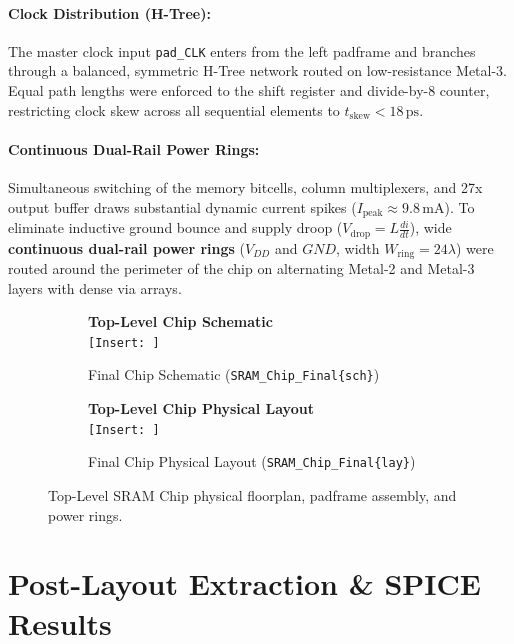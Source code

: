 \documentclass[10pt,a4paper,titlepage]{article}
\newcommand{\imageplaceholder}[3][3.4cm]{%
  \begin{tcolorbox}[
    colback=slate!3,
    colframe=navy!35,
    arc=2mm,
    boxrule=0.8pt,
    width=\linewidth,
    height=#1,
    valign=center,
    halign=center
  ]
    \centering
    {\small\textbf{\sffamily\color{navy!85} #2}}\\[0.3em]
    {\footnotesize\texttt{\color{crimson}[Insert: \detokenize{#3}]}}
  \end{tcolorbox}%
}
\begin{document}
\paragraph{Clock Distribution (H-Tree):} The master clock input \texttt{pad\_CLK} enters from the left padframe and branches through a balanced, symmetric H-Tree network routed on low-resistance Metal-3. Equal path lengths were enforced to the shift register and divide-by-8 counter, restricting clock skew across all sequential elements to \textbf{$t_{\text{skew}} < 18\,\text{ps}$}.

\paragraph{Continuous Dual-Rail Power Rings:} Simultaneous switching of the memory bitcells, column multiplexers, and 27x output buffer draws substantial dynamic current spikes ($I_{\text{peak}} \approx 9.8\,\text{mA}$). To eliminate inductive ground bounce and supply droop ($V_{\text{drop}} = L \frac{di}{dt}$), wide \textbf{continuous dual-rail power rings} ($V_{DD}$ and $GND$, width $W_{\text{ring}} = 24\lambda$) were routed around the perimeter of the chip on alternating Metal-2 and Metal-3 layers with dense via arrays.

\begin{figure}[h!]
\centering
\begin{subfigure}[b]{0.48\textwidth}
  \imageplaceholder{Top-Level Chip Schematic}{chip_sch.png}
  \caption{Final Chip Schematic (\texttt{SRAM\_Chip\_Final\{sch\}})}
\end{subfigure}
\hfill
\begin{subfigure}[b]{0.48\textwidth}
  \imageplaceholder{Top-Level Chip Physical Layout}{chip_lay.png}
  \caption{Final Chip Physical Layout (\texttt{SRAM\_Chip\_Final\{lay\}})}
\end{subfigure}
\caption{Top-Level SRAM Chip physical floorplan, padframe assembly, and power rings.}
\end{figure}

\newpage
\section{Post-Layout Extraction \& SPICE Results}
\end{document}

